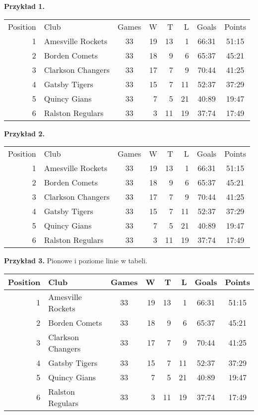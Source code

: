 \documentclass{article}
\begin{document}
\textbf{Przykład 1.} \\

\begin{tabular}{rlcrrrcc}
Position & Club & Games & W & T & L & Goals & Points \\ [0.2ex]
1 & Amesville Rockets & 33 & 19 & 13 & 1 & 66:31 & 51:15 \\
2 & Borden Comets & 33 & 18 & 9 & 6 & 65:37 & 45:21 \\
3 & Clarkson Changers & 33 & 17 & 7 & 9 & 70:44 & 41:25 \\
4 & Gatsby Tigers & 33 & 15 & 7 & 11 & 52:37 & 37:29 \\
5 & Quincy Gians & 33 & 7 & 5 & 21 & 40:89 & 19:47\\
6 & Ralston Regulars & 33 & 3 & 11 & 19 & 37:74 & 17:49
\end{tabular}
\vspace{.5cm}

\textbf{Przykład 2.}\\

\begin{tabular}{rlc*{3}{|r}cc}
Position & Club & Games & W & T & L & Goals & Points \\ [0.2ex]
1 & Amesville Rockets & 33 & 19 & 13 & 1 & 66:31 & 51:15 \\
2 & Borden Comets & 33 & 18 & 9 & 6 & 65:37 & 45:21 \\
3 & Clarkson Changers & 33 & 17 & 7 & 9 & 70:44 & 41:25 \\
4 & Gatsby Tigers & 33 & 15 & 7 & 11 & 52:37 & 37:29 \\
5 & Quincy Gians & 33 & 7 & 5 & 21 & 40:89 & 19:47\\
6 & Ralston Regulars & 33 & 3 & 11 & 19 & 37:74 & 17:49
\end{tabular}
\vspace{.5cm}

\textbf{Przykład 3.} Pionowe i poziome linie w tabeli.\\


\begin{tabular}{||r|l|c|r|r|r|c|c||}\hline
Position & Club & Games & W & T & L & Goals & Points \\\hline
1 & Amesville Rockets & 33 & 19 & 13 & 1 & 66:31 & 51:15 \\\hline
2 & Borden Comets & 33 & 18 & 9 & 6 & 65:37 & 45:21 \\\hline
3 & Clarkson Changers & 33 & 17 & 7 & 9 & 70:44 & 41:25 \\\hline
4 & Gatsby Tigers & 33 & 15 & 7 & 11 & 52:37 & 37:29 \\\hline
5 & Quincy Gians & 33 & 7 & 5 & 21 & 40:89 & 19:47\\\hline
6 & Ralston Regulars & 33 & 3 & 11 & 19 & 37:74 & 17:49\\
\hline
\end{tabular}
\vspace{.5cm}
\end{document}
